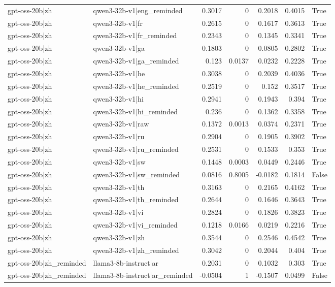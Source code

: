 \begin{table}
\begin{tabular}{l l r r r r l}
gpt-oss-20b|zh & qwen3-32b-v1|eng_reminded & 0.3017 & 0 & 0.2018 & 0.4015 & True \\
gpt-oss-20b|zh & qwen3-32b-v1|fr & 0.2615 & 0 & 0.1617 & 0.3613 & True \\
gpt-oss-20b|zh & qwen3-32b-v1|fr_reminded & 0.2343 & 0 & 0.1345 & 0.3341 & True \\
gpt-oss-20b|zh & qwen3-32b-v1|ga & 0.1803 & 0 & 0.0805 & 0.2802 & True \\
gpt-oss-20b|zh & qwen3-32b-v1|ga_reminded & 0.123 & 0.0137 & 0.0232 & 0.2228 & True \\
gpt-oss-20b|zh & qwen3-32b-v1|he & 0.3038 & 0 & 0.2039 & 0.4036 & True \\
gpt-oss-20b|zh & qwen3-32b-v1|he_reminded & 0.2519 & 0 & 0.152 & 0.3517 & True \\
gpt-oss-20b|zh & qwen3-32b-v1|hi & 0.2941 & 0 & 0.1943 & 0.394 & True \\
gpt-oss-20b|zh & qwen3-32b-v1|hi_reminded & 0.236 & 0 & 0.1362 & 0.3358 & True \\
gpt-oss-20b|zh & qwen3-32b-v1|raw & 0.1372 & 0.0013 & 0.0374 & 0.2371 & True \\
gpt-oss-20b|zh & qwen3-32b-v1|ru & 0.2904 & 0 & 0.1905 & 0.3902 & True \\
gpt-oss-20b|zh & qwen3-32b-v1|ru_reminded & 0.2531 & 0 & 0.1533 & 0.353 & True \\
gpt-oss-20b|zh & qwen3-32b-v1|sw & 0.1448 & 0.0003 & 0.0449 & 0.2446 & True \\
gpt-oss-20b|zh & qwen3-32b-v1|sw_reminded & 0.0816 & 0.8005 & -0.0182 & 0.1814 & False \\
gpt-oss-20b|zh & qwen3-32b-v1|th & 0.3163 & 0 & 0.2165 & 0.4162 & True \\
gpt-oss-20b|zh & qwen3-32b-v1|th_reminded & 0.2644 & 0 & 0.1646 & 0.3643 & True \\
gpt-oss-20b|zh & qwen3-32b-v1|vi & 0.2824 & 0 & 0.1826 & 0.3823 & True \\
gpt-oss-20b|zh & qwen3-32b-v1|vi_reminded & 0.1218 & 0.0166 & 0.0219 & 0.2216 & True \\
gpt-oss-20b|zh & qwen3-32b-v1|zh & 0.3544 & 0 & 0.2546 & 0.4542 & True \\
gpt-oss-20b|zh & qwen3-32b-v1|zh_reminded & 0.3042 & 0 & 0.2044 & 0.404 & True \\
gpt-oss-20b|zh_reminded & llama3-8b-instruct|ar & 0.2031 & 0 & 0.1032 & 0.303 & True \\
gpt-oss-20b|zh_reminded & llama3-8b-instruct|ar_reminded & -0.0504 & 1 & -0.1507 & 0.0499 & False \\

\end{tabular}
\end{table}
